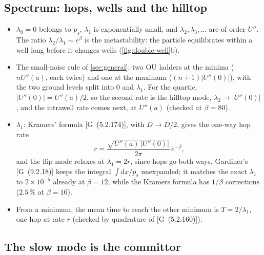 \documentclass[11pt]{article}
\numberwithin{equation}{section}
\newcommand{\dd}{\mathrm{d}}
\newcommand{\G}[1]{[G~(#1)]}
\begin{document}
\subsection{Spectrum: hops, wells and the hilltop}

\begin{itemize}
  \item $\lambda_0=0$ belongs to $p_s$, $\lambda_1$ is exponentially small, and $\lambda_2,\lambda_3,\dots$ are of
        order $U''$. The ratio $\lambda_2/\lambda_1\sim e^\beta$ is the metastability: the particle equilibrates
        within a well long before it changes wells (\cref{fig:double-well}b).
  \item The small-noise rule of \cref{sec:general}: two OU ladders at the minima ($nU''(a)$, each twice) and one
        at the maximum ($(n+1)|U''(0)|$), with the two ground levels split into $0$ and $\lambda_1$. For the quartic,
        $|U''(0)|=U''(a)/2$, so the second rate is the hilltop mode, $\lambda_2\to|U''(0)|$, and the intrawell rate
        comes next, at $U''(a)$ (checked at $\beta=80$).
  \item $\lambda_1$: Kramers' formula \G{5.2.174}, with $D\to D/2$, gives the one-way hop rate
        \begin{equation*}
          r=\frac{\sqrt{U''(a)\,|U''(0)|}}{2\pi}\,e^{-\beta},
        \end{equation*}
        and the flip mode relaxes at $\lambda_1=2r$, since hops go both
        ways. Gardiner's \G{9.2.18} keeps the integral $\int\dd x/p_s$ unexpanded; it matches the exact
        $\lambda_1$ to $2\times10^{-5}$ already at $\beta=12$, while the Kramers formula has $1/\beta$ corrections
        ($2.5\,\%$ at $\beta=16$).
  \item From a minimum, the mean time to reach the other minimum is $T=2/\lambda_1$, one hop at rate $r$
        (checked by quadrature of \G{5.2.160}).
\end{itemize}

\subsection{The slow mode is the committor}
\end{document}
